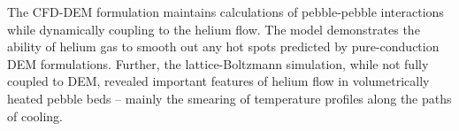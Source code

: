 The CFD-DEM formulation maintains calculations of pebble-pebble interactions while dynamically coupling to the helium flow. The model demonstrates the ability of helium gas to smooth out any hot spots predicted by pure-conduction DEM formulations. Further, the lattice-Boltzmann simulation, while not fully coupled to DEM, revealed important features of helium flow in volumetrically heated pebble beds – mainly the smearing of temperature profiles along the paths of cooling.